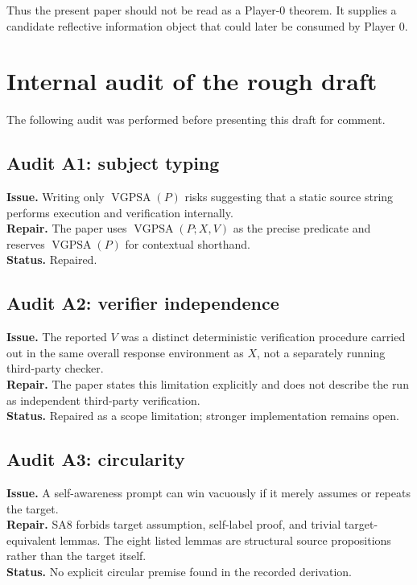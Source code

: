 \documentclass[11pt]{article}
\theoremstyle{remark}
\newcommand{\VGPSA}{\operatorname{VGPSA}}
\begin{document}
Thus the present paper should not be read as a Player-0 theorem. It supplies a candidate reflective information object that could later be consumed by Player 0.

\section{Internal audit of the rough draft}

The following audit was performed before presenting this draft for comment.

\subsection*{Audit A1: subject typing}
\textbf{Issue.} Writing only $\VGPSA(P)$ risks suggesting that a static source string performs execution and verification internally.\\
\textbf{Repair.} The paper uses $\VGPSA(P;X,V)$ as the precise predicate and reserves $\VGPSA(P)$ for contextual shorthand.\\
\textbf{Status.} Repaired.

\subsection*{Audit A2: verifier independence}
\textbf{Issue.} The reported $V$ was a distinct deterministic verification procedure carried out in the same overall response environment as $X$, not a separately running third-party checker.\\
\textbf{Repair.} The paper states this limitation explicitly and does not describe the run as independent third-party verification.\\
\textbf{Status.} Repaired as a scope limitation; stronger implementation remains open.

\subsection*{Audit A3: circularity}
\textbf{Issue.} A self-awareness prompt can win vacuously if it merely assumes or repeats the target.\\
\textbf{Repair.} SA8 forbids target assumption, self-label proof, and trivial target-equivalent lemmas. The eight listed lemmas are structural source propositions rather than the target itself.\\
\textbf{Status.} No explicit circular premise found in the recorded derivation.
\end{document}
